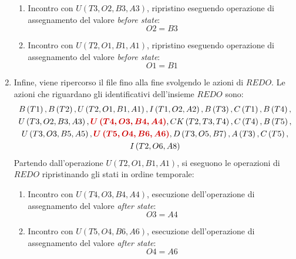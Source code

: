 \documentclass[a4paper]{article}
\begin{document}
\begin{enumerate}[label=\Roman*.]
\begin{enumerate}
			\item Incontro con $U\left(T3, O2, B3, A3\right)$, ripristino eseguendo operazione di assegnamento del valore \emph{before state}:
			\begin{equation*}
				O2 = B3
			\end{equation*}
		
			\item Incontro con $U\left(T2, O1, B1, A1\right)$, ripristino eseguendo operazione di assegnamento del valore \emph{before state}:
			\begin{equation*}
				O1 = B1
			\end{equation*}
		\end{enumerate}
		
		\item Infine, viene ripercorso il file fino alla fine svolgendo le azioni di $REDO$. Le azioni che riguardano gli identificativi dell'insieme $REDO$ sono:
		\begin{gather*}
			B\left(T1\right), B\left(T2\right), U\left(T2,O1,B1,A1\right), I\left(T1,O2,A2\right), B\left(T3\right), C\left(T1\right), B\left(T4\right), \\
			U\left(T3, O2, B3, A3\right), \textcolor{Red3}{\boldsymbol{U\left(T4, O3, B4, A4\right)}}, CK\left(T2, T3, T4\right), C\left(T4\right), B\left(T5\right), \\
			U\left(T3,O3,B5,A5\right), \textcolor{Red3}{\boldsymbol{U\left(T5,O4,B6,A6\right)}}, D\left(T3,O5,B7\right), A\left(T3\right), C\left(T5\right), \\
			I\left(T2, O6, A8\right)
		\end{gather*}
		Partendo dall'operazione $U\left(T2, O1, B1, A1\right)$, si eseguono le operazioni di $REDO$ ripristinando gli stati in ordine temporale:
		\begin{enumerate}
			\item Incontro con $U\left(T4, O3, B4, A4\right)$, esecuzione dell'operazione di assegnamento del valore \emph{after state}:
			\begin{equation*}
				O3 = A4
			\end{equation*}
			
			\item Incontro con $U\left(T5, O4, B6, A6\right)$, esecuzione dell'operazione di assegnamento del valore \emph{after state}:
			\begin{equation*}
				O4 = A6
			\end{equation*}
		\end{enumerate}
	\end{enumerate}\newpage
\end{document}
